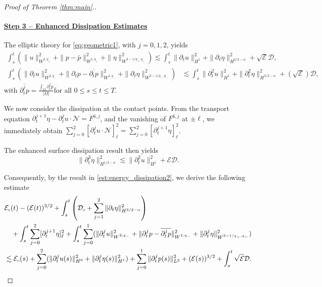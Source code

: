 \documentclass[letterpaper,reqno,10pt,twoside]{amsart}
\theoremstyle{definition}
\theoremstyle{remark}
\def\p{\partial}
\begin{document}
\begin{proof}[Proof of Theorem \ref{thm:main}.]
			\paragraph{\underline{Step 3 -- Enhanced Dissipation Estimates}}
			{The elliptic theory for \eqref{eq:geometric1}, with $j=0, 1,2$, yields
				\[
				\begin{aligned}
					\int_s^t(\|u\|_{W^{2,q_+}}^2+\|p-\bar{p}\|_{W^{1,q_+}}^2+\|\eta\|_{W^{3-1/q_+,q_+}}^2)
					\lesssim \int_s^t\|\p_tu\|_{H^1}^2+\|\p_t\eta\|_{H^{3/2-\alpha}}^2+\sqrt{\mathcal{E}}\mathcal{D},
				\end{aligned}
				\]
				\[
				\begin{aligned}
					\int_s^t(\|\p_tu\|_{W^{2,q_-}}^2+\|\p_tp-\overline{\p_{t}{p}}\|_{W^{1,q_-}}^2+\|\p_t\eta\|_{W^{3-1/q_-,q_-}}^2)
					&\lesssim \int_s^t\|\p_t^2u\|_{H^1}^2+\|\p_t^2\eta\|_{H^{3/2-\alpha}}^2+(\sqrt{\mathcal{E}})\mathcal{D},
				\end{aligned}
				\]
				with $\overline{\p_{t}^{j}p}=\frac{\int_{\Omega}\p_{t}^{j}p}{|\Omega|}$for all $0\le s\le t\le T$.
				
				We now consider the dissipation at the contact points.  From the transport equation
				$
				\p_t^{j+1}\eta-\p_t^ju\cdot\mathcal{N}=F^{6,j}$,
				and the vanishing of $F^{6,j}$ at $\pm\ell$, we immediately obtain
				$\sum_{j=0}^2[\p_t^ju\cdot\mathcal{N}]_\ell^2=\sum_{j=0}^2[\p_t^{j+1}\eta]_\ell^2$.
				
				The enhanced surface dissipation result then yields
				\[
				\|\p_t^3\eta\|_{H^{1/2-\alpha}}^2\lesssim \|\p_t^2u\|_{H^1}^2+\mathcal{E}\mathcal{D}.
				\]
				
				Consequently, by the result in \eqref{est:energy_dissipation2}, we derive the following estimate
				\begin{equation}\label{est:energy_dissipation3}
					\begin{aligned}
						&\mathcal{E}_\shortparallel(t)-(\mathcal{E}(t))^{3/2}+\int_s^t\left(\mathcal{D}_\shortparallel+\sum_{j=1}^2\|\p_t\eta\|_{H^{3/2-\alpha}}^2\right)\\
						&\quad+\int_s^t\sum_{j=0}^2[\p_t^{j+1}\eta]_\ell^2+\int_s^t\sum_{j=0}^{1}(\|\p_t^{j}u\|_{W^{2,q_-}}^2+\|\p_t^{j}p-\overline{\p_{t}^{j}p}\|_{W^{1,q_-}}^2+\|\p_t^{j}\eta\|_{W^{3-1/q_-,q_-}}^2)\\
						&\lesssim\mathcal{E}_\shortparallel(s)+\sum_{j=0}^2(\|\p_t^ju(s)\|_{H^0}^2+\|\p_t^j\eta(s)\|_{H^1}^2)+\sum_{j=0}^{1}\|\p_{t}^{j}p(s)\|^{2}_{L^{2}}+(\mathcal{E}(s))^{3/2}+\int_s^t\sqrt{\mathcal{E}}\mathcal{D}.
					\end{aligned}
				\end{equation}
			}

\end{proof}
\end{document}
